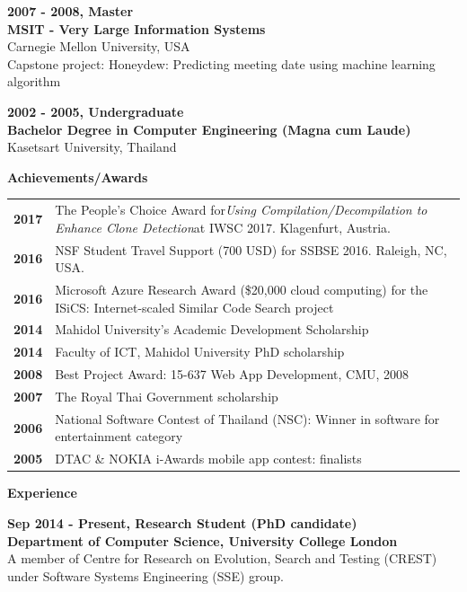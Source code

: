 \documentclass[a4paper,12pt,final]{memoir}
\newcommand{\Sep}{\vspace{1.5em}}
\newcommand{\SmallSep}{\vspace{0.5em}}
\newcommand{\CVSection}[1]
	{\Large\textbf{#1}\par
	\SmallSep\normalsize\normalfont}
\newcommand{\CVItem}[1]
	{\textbf{\color{RoyalBlue} #1}}
\begin{document}
\CVItem{2007 - 2008, Master}\\
\textbf{MSIT - Very Large Information Systems}\\
Carnegie Mellon University, USA\\
Capstone project: Honeydew: Predicting meeting date using machine learning algorithm

\SmallSep

\CVItem{2002 - 2005, Undergraduate}\\
\textbf{Bachelor Degree in Computer Engineering (Magna cum Laude)}\\
Kasetsart University, Thailand
\SmallSep
\Sep

\CVSection{Achievements/Awards}
\begin{tabular}{lp{11.5cm}}
	
	\CVItem{2017} & The People's Choice Award for\newline \textit{Using Compilation/Decompilation to Enhance Clone Detection}\newline at IWSC 2017. Klagenfurt, Austria. \\
	\CVItem{2016} & NSF Student Travel Support (700 USD) for SSBSE 2016. Raleigh, NC, USA. \\
	\CVItem{2016} & Microsoft Azure Research Award (\$20,000 cloud computing) for the ISiCS: Internet-scaled Similar Code Search project \\ 
	\CVItem{2014} & Mahidol University’s Academic Development Scholarship \\
	\CVItem{2014} & Faculty of ICT, Mahidol University PhD scholarship \\
	\CVItem{2008} & Best Project Award: 15-637 Web App Development, CMU, 2008 \\
	\CVItem{2007} & The Royal Thai Government scholarship \\
	\CVItem{2006} & National Software Contest of Thailand (NSC): Winner in software for entertainment category \\ 
	\CVItem{2005} & DTAC \& NOKIA i-Awards mobile app contest: finalists
\end{tabular} 
\SmallSep
\Sep

\CVSection{Experience}
\CVItem{Sep 2014 - Present, Research Student (PhD candidate)}\\
\textbf{Department of Computer Science, University College London}\\
A member of Centre for Research on Evolution, Search and Testing (CREST) under Software Systems Engineering (SSE) group. \\
\end{document}
